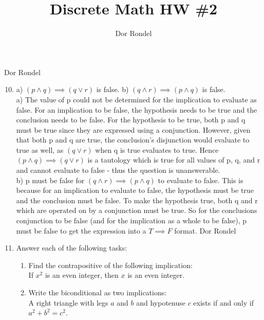 \documentclass{article}
\title{Discrete Math HW \#2}
\author{Dor Rondel}
\newcommand\tab[1][1cm]{\hspace*{#1}}
\begin{document}
\maketitle
\newpage
Dor Rondel \\
\begin{enumerate}
  \setcounter{enumi}{9}
  \item 
     a) $(p\land q) \implies (q \lor r)$ is false.
     \tab b) $(q \land r) \implies (p \land q)$ is false.
     \newline \\
     a) The value of p could not be determined for the implication to              evaluate as false. For an implication to be false, the hypothesis            needs to be true and the conclusion needs to be false. For the              hypothesis to be true, both p and q must be true since they are              expressed using a conjunction. However, given that both p and q are          true, the conclusion's disjunction would evaluate to true as well, as        $(q \lor r)$ when q is true evaluates to true. Hence $(p\land q)             \implies (q \lor r)$ is a tautology which is true for all values of         p, q, and r and cannot evaluate to false - thus the question is             unanswerable.
    \newline \\
    b) p must be false for $(q \land r) \implies (p \land q)$ to evaluate to     false. This is because for an implication to evaluate to false, the         hypothesis must be true and the conclusion must be false. To make the       hypothesis true, both q and r which are operated on by a conjunction         must be true. So for the conclusions conjunction to be false (and for       the implication as a whole to be false), p must be false to get the         expression into a $T \implies F$ format.  
\newpage
Dor Rondel \\
    \item Answer each of the following tasks:
    \begin{enumerate}
    \item Find the contrapositive of the following implication: \\
     If $x^2$ is an even integer, then $x$ is an even integer. 
     \item Write the biconditional as two implications: \\
     A right triangle with legs $a$ and $b$ and hypotenuse $c$ exists if and     only if $a^2+b^2=c^2$.
    \end{enumerate}

\end{enumerate}
\end{document}
